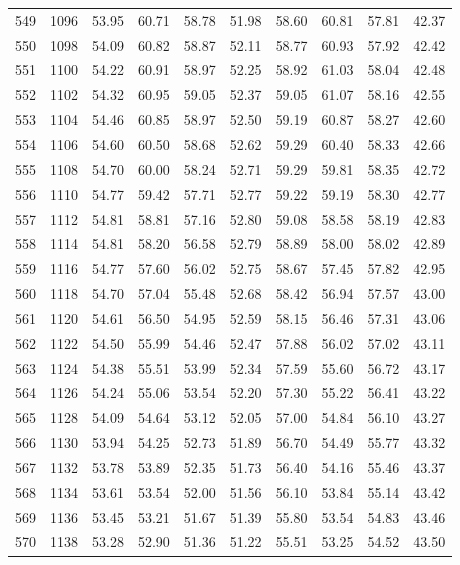 \begin{longtable}{rrllllllll}
		549 & 1096 & 53.95 & 60.71 & 58.78 & 51.98 & 58.60 & 60.81 & 57.81 & 42.37 \\ 
		550 & 1098 & 54.09 & 60.82 & 58.87 & 52.11 & 58.77 & 60.93 & 57.92 & 42.42 \\ 
		551 & 1100 & 54.22 & 60.91 & 58.97 & 52.25 & 58.92 & 61.03 & 58.04 & 42.48 \\ 
		552 & 1102 & 54.32 & 60.95 & 59.05 & 52.37 & 59.05 & 61.07 & 58.16 & 42.55 \\ 
		553 & 1104 & 54.46 & 60.85 & 58.97 & 52.50 & 59.19 & 60.87 & 58.27 & 42.60 \\ 
		554 & 1106 & 54.60 & 60.50 & 58.68 & 52.62 & 59.29 & 60.40 & 58.33 & 42.66 \\ 
		555 & 1108 & 54.70 & 60.00 & 58.24 & 52.71 & 59.29 & 59.81 & 58.35 & 42.72 \\ 
		556 & 1110 & 54.77 & 59.42 & 57.71 & 52.77 & 59.22 & 59.19 & 58.30 & 42.77 \\ 
		557 & 1112 & 54.81 & 58.81 & 57.16 & 52.80 & 59.08 & 58.58 & 58.19 & 42.83 \\ 
		558 & 1114 & 54.81 & 58.20 & 56.58 & 52.79 & 58.89 & 58.00 & 58.02 & 42.89 \\ 
		559 & 1116 & 54.77 & 57.60 & 56.02 & 52.75 & 58.67 & 57.45 & 57.82 & 42.95 \\ 
		560 & 1118 & 54.70 & 57.04 & 55.48 & 52.68 & 58.42 & 56.94 & 57.57 & 43.00 \\ 
		561 & 1120 & 54.61 & 56.50 & 54.95 & 52.59 & 58.15 & 56.46 & 57.31 & 43.06 \\ 
		562 & 1122 & 54.50 & 55.99 & 54.46 & 52.47 & 57.88 & 56.02 & 57.02 & 43.11 \\ 
		563 & 1124 & 54.38 & 55.51 & 53.99 & 52.34 & 57.59 & 55.60 & 56.72 & 43.17 \\ 
		564 & 1126 & 54.24 & 55.06 & 53.54 & 52.20 & 57.30 & 55.22 & 56.41 & 43.22 \\ 
		565 & 1128 & 54.09 & 54.64 & 53.12 & 52.05 & 57.00 & 54.84 & 56.10 & 43.27 \\ 
		566 & 1130 & 53.94 & 54.25 & 52.73 & 51.89 & 56.70 & 54.49 & 55.77 & 43.32 \\ 
		567 & 1132 & 53.78 & 53.89 & 52.35 & 51.73 & 56.40 & 54.16 & 55.46 & 43.37 \\ 
		568 & 1134 & 53.61 & 53.54 & 52.00 & 51.56 & 56.10 & 53.84 & 55.14 & 43.42 \\ 
		569 & 1136 & 53.45 & 53.21 & 51.67 & 51.39 & 55.80 & 53.54 & 54.83 & 43.46 \\ 
		570 & 1138 & 53.28 & 52.90 & 51.36 & 51.22 & 55.51 & 53.25 & 54.52 & 43.50 \\ 

\end{longtable}
